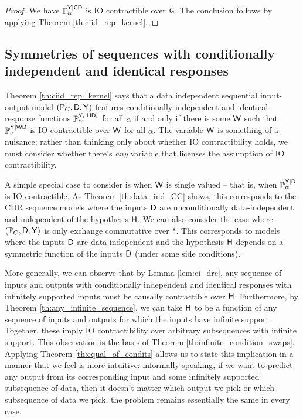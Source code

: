 \begin{proof}
We have $\mathbb{P}_\alpha^{\mathsf{Y}|\mathsf{G}\mathsf{D}}$ is IO contractible over $\mathsf{G}$. The conclusion follows by applying Theorem \ref{th:ciid_rep_kernel}.
\end{proof}

\subsection[Symmetries of CIIR sequences]{Symmetries of sequences with conditionally independent and identical responses}\label{sec:data_independent_actions}

Theorem \ref{th:ciid_rep_kernel} says that a data independent sequential input-output model $(\mathbb{P}_C,\mathsf{D},\mathsf{Y})$ features conditionally independent and identical response functions $\mathbb{P}_\alpha^{\mathsf{Y}_i|\mathsf{HD}_i}$ for all $\alpha$ if and only if there is some $\mathsf{W}$ such that $\mathbb{P}_\alpha^{\mathsf{Y}|\mathsf{WD}}$ is IO contractible over $\mathsf{W}$ for all $\alpha$. The variable $\mathsf{W}$ is something of a nuisance; rather than thinking only about whether IO contractibility holds, we must consider whether there's \emph{any} variable that licenses the assumption of IO contractibility.

A simple special case to consider is when $\mathsf{W}$ is single valued -- that is, when $\mathbb{P}_\alpha^{\mathsf{Y}|\mathsf{D}}$ is IO contractible. As Theorem \ref{th:data_ind_CC} shows, this corresponds to the CIIR sequence models where the inputs $\mathsf{D}$ are unconditionally data-independent and independent of the hypothesis $\mathsf{H}$. We can also consider the case where $(\mathbb{P}_C, \mathsf{D},\mathsf{Y})$ is only exchange commutative over $*$. This corresponds to models where the inputs $\mathsf{D}$ are data-independent and the hypothesis $\mathsf{H}$ depends on a symmetric function of the inputs $\mathsf{D}$ (under some side conditions).

More generally, we can observe that by Lemma \ref{lem:ci_drc}, any sequence of inputs and outputs with conditionally independent and identical responses with infinitely supported inputs must be causally contractible over $\mathsf{H}$. Furthermore, by Theorem \ref{th:any_infinite_sequence}, we can take $\mathsf{H}$ to be a function of any sequence of inputs and outputs for which the inputs have infinite support. Together, these imply IO contractibility over arbitrary subsequences with infinite support. This observation is the basis of Theorem \ref{th:infinite_condition_swaps}. Applying Theorem \ref{th:equal_of_condits} allows us to state this implication in a manner that we feel is more intuitive: informally speaking, if we want to predict any output from its corresponding input and some infinitely supported subsequence of data, then it doesn't matter which output we pick or which subsequence of data we pick, the problem remains essentially the same in every case.

